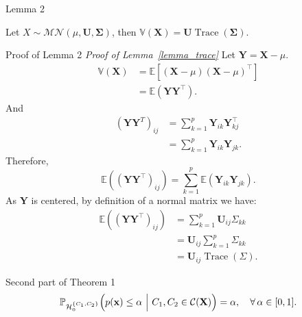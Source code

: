 \documentclass{beamer}
\begin{document}
\begin{frame}{Lemma 2}
  \begin{lemma}\label{lemma_trace}
    Let $X \sim \mathcal{MN}(\mu, \mathbf{U}, \mathbf{\Sigma})$, then $\mathbb{V}(\mathbf{X}) = \mathbf{U} \operatorname{Trace}(\mathbf{\Sigma})$.
  \end{lemma}
\end{frame}

\begin{frame}[allowframebreaks]{Proof of Lemma 2}
  \textit{Proof of Lemma~\ref{lemma_trace}}
    Let $\mathbf{Y} = \mathbf{X} - \mu$.
    \begin{equation*}
      \begin{aligned}
        \mathbb{V}(\mathbf{X}) &= \mathbb{E}[(\mathbf{X}-\mu)(\mathbf{X}-\mu)^\top] \\
                               &= \mathbb{E}(\mathbf{Y}\mathbf{Y}^\top).
      \end{aligned}
    \end{equation*}
    And
    \begin{equation*}
      \begin{aligned}
        (\mathbf{Y}\mathbf{Y}^T)_{ij} &= \sum_{k=1}^p \mathbf{Y}_{ik} \mathbf{Y}^\top_{kj} \\
                                      &= \sum_{k=1}^p \mathbf{Y}_{ik} \mathbf{Y}_{jk}.
      \end{aligned}
    \end{equation*}
    Therefore,
    \begin{equation*}
      \mathbb{E}((\mathbf{Y}\mathbf{Y}^\top)_{ij}) = \sum_{k=1}^p \mathbb{E}(\mathbf{Y}_{ik} \mathbf{Y}_{jk}).
    \end{equation*}
    As $\mathbf{Y}$ is centered, by definition of a normal matrix we have:
    \begin{equation*}
      \begin{aligned}
        \mathbb{E}((\mathbf{Y}\mathbf{Y}^\top)_{ij}) &= \sum_{k=1}^p \mathbf{U}_{ij}\Sigma_{kk} \\
                                                     &= \mathbf{U}_{ij} \sum_{k=1}^p \Sigma_{kk} \\
                                                     &= \mathbf{U}_{ij} \operatorname{Trace}(\Sigma).
      \end{aligned}
    \end{equation*}
\end{frame}

\begin{frame}{Second part of Theorem 1}
  \begin{equation*}
    \mathbb{P}_{\mathcal{H}_0^{\{C_1,C_2\}}}\Bigl(p(\mathbf{x}) \leq \alpha ~\Big|~ C_1,C_2 \in \mathcal{C}(\mathbf{X})\Bigr) = \alpha, \quad \forall\, \alpha \in [0,1].
  \end{equation*}
\end{frame}
\end{document}
